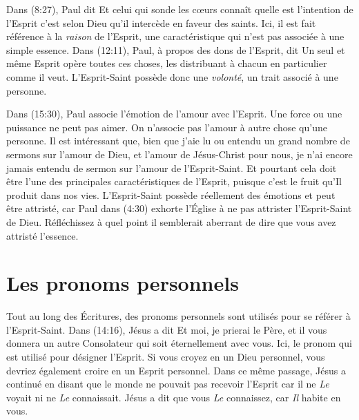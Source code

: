 Dans (8:27), Paul dit\frcolon{} \Og Et celui qui sonde les cœurs
 connaît quelle est l'intention de l'Esprit\frcolon{} c'est selon Dieu qu'il
 intercède en faveur des saints. \Fg{} Ici, il est fait référence
 à la \emph{raison} de l'Esprit, une caractéristique qui n'est pas associée à
 une simple essence. Dans (12:11), Paul, à propos des dons de
 l'Esprit, dit\frcolon{} \Og Un seul et même Esprit opère toutes ces choses, les
 distribuant à chacun en particulier comme il veut. \Fg{} L'Esprit-Saint
 possède donc une \emph{volonté}, un trait associé à une personne.

Dans (15:30), Paul associe l'émotion de l'amour avec l'Es\-prit.
 Une force ou une puissance ne peut pas aimer. On n'associe pas l'amour à autre
 chose qu'une personne. Il est intéressant que, bien que j'aie lu ou
 entendu un grand nombre de sermons sur l'amour de Dieu, et l'amour de
 Jésus-Christ pour nous, je n'ai encore jamais entendu de sermon sur l'amour de
 l'Esprit-Saint. Et pourtant cela doit être l'une des principales
 caractéristiques de l'Esprit, puisque c'est le fruit qu'Il produit dans nos
 vies.
 L'Esprit-Saint possède réellement des émotions et peut être attristé,
 car Paul dans (4:30) exhorte l'Église à ne pas attrister
 l'Esprit-Saint de Dieu. Réfléchissez à quel point il semblerait aberrant
 de dire que vous avez attristé l'essence.


\section{Les pronoms personnels}

Tout au long des Écritures, des pronoms personnels sont utilisés pour se
 référer à l'Esprit-Saint. Dans (14:16), Jésus a dit\frcolon{}
 \Og Et moi, je prierai le Père, et il vous donnera un autre Consolateur
 qui soit éternellement avec vous. \Fg{}
 Ici, le pronom \Og qui \Fg{} est utilisé pour désigner l'Esprit.
 Si vous croyez en un Dieu personnel, vous devriez également croire en
 un Esprit personnel. Dans ce même passage, Jésus a continué en disant
 que le monde ne pouvait pas recevoir l'Esprit car il ne \emph{Le} voyait ni
 ne \emph{Le} connaissait. Jésus a dit que vous \emph{Le} connaissez,
 car \emph{Il} habite en vous.

